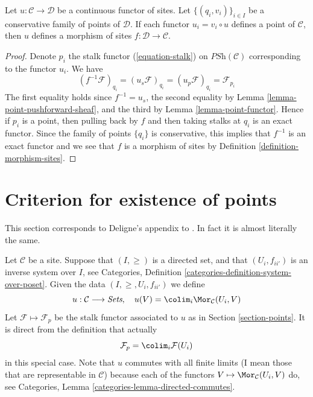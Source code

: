 \begin{lemma}
\label{lemma-check-morphism-sites}
Let $u : \mathcal{C} \to \mathcal{D}$ be a continuous functor of sites.
Let $\{(q_i, v_i)\}_{i\in I}$ be a conservative family of points of
$\mathcal{D}$. If each functor $u_i = v_i \circ u$ defines
a point of $\mathcal{C}$,
then $u$ defines a morphism of sites $f : \mathcal{D} \to \mathcal{C}$.
\end{lemma}

\begin{proof}
Denote $p_i$ the stalk functor (\ref{equation-stalk}) on
$\textit{PSh}(\mathcal{C})$ corresponding to the functor $u_i$. We have
$$
(f^{-1}\mathcal{F})_{q_i} =
(u_s\mathcal{F})_{q_i} =
(u_p\mathcal{F})_{q_i} =
\mathcal{F}_{p_i}
$$
The first equality holds since $f^{-1} = u_s$, the second equality
by Lemma \ref{lemma-point-pushforward-sheaf}, and the third
by Lemma \ref{lemma-point-functor}.
Hence if $p_i$ is a point, then pulling back by $f$
and then taking stalks at $q_i$ is an exact functor.
Since the family of points $\{q_i\}$ is conservative, this
implies that $f^{-1}$ is an exact functor and we see
that $f$ is a morphism of sites by Definition \ref{definition-morphism-sites}.
\end{proof}





\section{Criterion for existence of points}
\label{section-criterion-points}

\noindent
This section corresponds to Deligne's appendix to \cite[Expos\'e VI]{SGA4}.
In fact it is almost literally the same.

\medskip\noindent
Let $\mathcal{C}$ be a site.
Suppose that $(I, \geq)$ is a directed set,
and that $(U_i, f_{ii'})$ is an inverse system over $I$, see
Categories, Definition \ref{categories-definition-system-over-poset}.
Given the data $(I, \geq, U_i, f_{ii'})$ we define
$$
u : \mathcal{C} \longrightarrow \textit{Sets}, \quad
u(V) = \colim_i \Mor_\mathcal{C}(U_i , V)
$$
Let $\mathcal{F} \mapsto \mathcal{F}_p$ be the stalk functor
associated to $u$ as in Section \ref{section-points}.
It is direct from the definition that actually
$$
\mathcal{F}_p = \colim_i \mathcal{F}(U_i)
$$
in this special case.
Note that $u$ commutes with all finite limits (I mean those that
are representable in $\mathcal{C}$) because
each of the functors $V \mapsto \Mor_\mathcal{C}(U_i , V)$
do, see Categories, Lemma \ref{categories-lemma-directed-commutes}.

